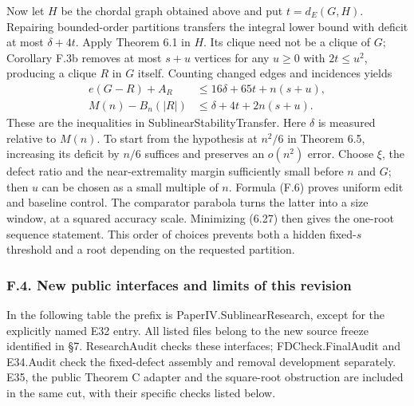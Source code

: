 \documentclass[english,11pt,a4paper]{article}
\begin{document}
Now let \(H\) be the chordal graph obtained above and put \(t=d_E(G,H)\). Repairing bounded-order partitions transfers the integral lower bound with deficit at most \(\delta+4t\). Apply Theorem 6.1 in \(H\). Its clique need not be a clique of \(G\); Corollary F.3b removes at most \(s+u\) vertices for any \(u\ge0\) with \(2t\le u^2\), producing a clique \(R\) in \(G\) itself. Counting changed edges and incidences yields \[
\begin{aligned}
e(G-R)+A_R&\le16\delta+65t+n(s+u),\\
M(n)-B_n(|R|)&\le\delta+4t+2n(s+u).
\end{aligned}
\tag{F.6}
\] These are the inequalities in SublinearStabilityTransfer. Here \(\delta\) is measured relative to \(M(n)\). To start from the hypothesis at \(n^2/6\) in Theorem 6.5, increasing its deficit by \(n/6\) suffices and preserves an \(o(n^2)\) error. Choose \(\xi\), the defect ratio and the near-extremality margin sufficiently small before \(n\) and \(G\); then \(u\) can be chosen as a small multiple of \(n\). Formula (F.6) proves uniform edit and baseline control. The comparator parabola turns the latter into a size window, at a squared accuracy scale. Minimizing (6.27) then gives the one-root sequence statement. This order of choices prevents both a hidden fixed-\(s\) threshold and a root depending on the requested partition.

\subsubsection{F.4. New public interfaces and limits of this revision}\label{f.4.-new-public-interfaces-and-limits-of-this-revision}

In the following table the prefix is {\ttfamily\small PaperIV.\discretionary{\hbox{\ensuremath{\hookrightarrow}}}{}{}SublinearRes\discretionary{\hbox{\ensuremath{\hookrightarrow}}}{}{}earch}, except for the explicitly named E32 entry. All listed files belong to the new source freeze identified in §7. ResearchAudit checks these interfaces; FDCheck.FinalAudit and E34.Audit check the fixed-defect assembly and removal development separately. E35, the public Theorem C adapter and the square-root obstruction are included in the same cut, with their specific checks listed below.
\end{document}

